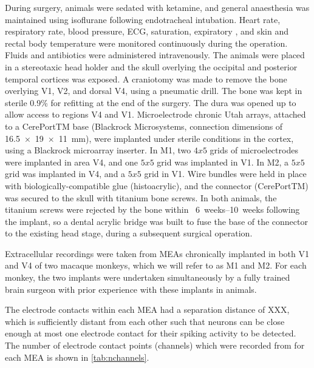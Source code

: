 During surgery, animals were sedated with ketamine, and general anaesthesia was maintained using isoflurane following endotracheal intubation.
Heart rate, respiratory rate, blood pressure, ECG,  saturation, expiratory , and skin and rectal body temperature were monitored continuously during the operation.
Fluids and antibiotics were administered intravenously.
The animals were placed in a stereotaxic head holder and the skull overlying the occipital and posterior temporal cortices was exposed.
A craniotomy was made to remove the bone overlying \ac{V1}, V2, and dorsal \ac{V4}, using a pneumatic drill.
The bone was kept in sterile 0.9\%  for refitting at the end of the surgery.
The dura was opened up to allow access to regions \ac{V4} and \ac{V1}.
Microelectrode chronic Utah arrays, attached to a CerePortTM base (Blackrock Microsystems, connection dimensions of \SI{16.5 x 19 x 11}{\milli\metre}), were implanted under sterile conditions in the cortex, using a Blackrock microarray inserter.
In \ac{M1}, two $4x5$ grids of microelectrodes were implanted in area \ac{V4}, and one $5x5$ grid was implanted in \ac{V1}.
In \ac{M2}, a $5x5$ grid was implanted in \ac{V4}, and a $5x5$ grid in \ac{V1}.
Wire bundles were held in place with biologically-compatible glue (histoacrylic), and the connector (CerePortTM) was secured to the skull with titanium bone screws.
In both animals, the titanium screws were rejected by the bone within ~\SIrange{6}{10}{weeks} following the implant, so a dental acrylic bridge was built to fuse the base of the connector to the existing head stage, during a subsequent surgical operation.



Extracellular recordings were taken from \acp{MEA} chronically implanted in both \ac{V1} and \ac{V4} of two macaque monkeys, which we will refer to as \ac{M1} and \ac{M2}.
For each monkey, the two implants were undertaken simultaneously by a fully trained brain surgeon with prior experience with these implants in animals.

The electrode contacts within each \ac{MEA} had a separation distance of XXX,%
which is sufficiently distant from each other such that neurons can be close enough at most one electrode contact for their spiking activity to be detected.%
The number of electrode contact points (channels) which were recorded from for each \ac{MEA} is shown in \autoref{tab:nchannels}.

